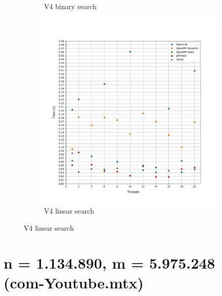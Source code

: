 \documentclass[12pt, a4paper]{article}
\begin{document}
\begin{figure}[h!]
\begin{subfigure}[b]{0.33\textwidth}
         \caption{V4 binary search}
     \end{subfigure}
     \begin{subfigure}[b]{0.33\textwidth}
         \centering
         \includegraphics[height=.4\textheight, width=\textwidth, keepaspectratio]{assets/belgium/v4_linear.png}
         \caption{V4 linear search} 
     \end{subfigure}
\end{figure}

\pagebreak
\section{n = 1.134.890, m = 5.975.248 (com-Youtube.mtx)}
\end{document}
